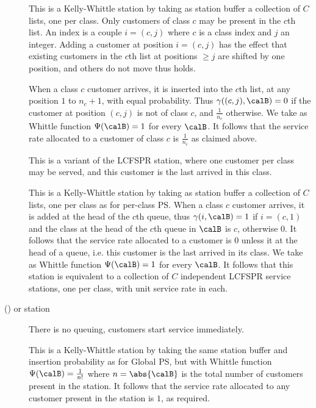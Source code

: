 \begin{description}
This is a Kelly-Whittle station by taking as
station buffer a collection of
    $C$ lists, one per class. Only customers of class $c$
    may be present in the $c$th list. An index is a
    couple $i=(c,j)$ where $c$ is a class index
    and $j$ an integer. Adding
    a customer at position $i=(c,j)$ has the effect that existing
    customers in the $c$th list at positions $\geq j$ are shifted by one
    position, and others do not move thus  holds.

    When a class $c$ customer arrives, it is
    inserted into the $c$th list, at any position
    $1$ to $n_c+1$, with equal probability. Thus
    $\gamma((c,j),\calB)=0$ if the customer at
    position $(c,j)$ is not of class $c$, and
    $\frac{1}{n_c}$ otherwise.
    We take as Whittle function
    $\Psi(\calB)=1$ for every $\calB$. It follows
    that the service rate allocated to a
    customer of class $c$ is $\frac{1}{n_c}$ as
    claimed above.


    \item[\nt{Per-Class LCFSPR}] This is a variant
    of the LCFSPR station, where one
    customer per class may be served, and this customer is the last arrived
    in this class.

    This is a Kelly-Whittle station by taking as
station buffer a collection of $C$ lists, one per class as
    for per-class PS. When a class $c$ customer arrives, it
    is added at the head of the $c$th queue, thus
    $\gamma(i,\calB)=1$ if $i=(c,1)$ and the class at the
    head of the $c$th queue in $\calB$ is $c$, otherwise
    $0$. It follows that the service rate allocated to a
    customer is $0$ unless it at the head of a queue, i.e.
    this customer is the last arrived in its class. We take
    as Whittle function $\Psi(\calB)=1$ for every $\calB$.
    It follows that this station is equivalent to a
    collection of $C$ independent LCFSPR service stations,
    one per class, with unit service rate in each.

\item[\nt{Infinite Server} (\nt{IS}) or \nt{Delay}
    station] There is no queuing, customers
    start service immediately.

This is a Kelly-Whittle station by taking the
same  station buffer and insertion probability as
for Global PS, but with Whittle function
     $
     \Psi(\calB)=\frac{1}{n!}
     $ where $n= \abs{\calB}$ is the total number
     of customers present in the station.
     It follows that the service rate allocated to any
     customer present in the station is $1$, as
required.



\end{description}
